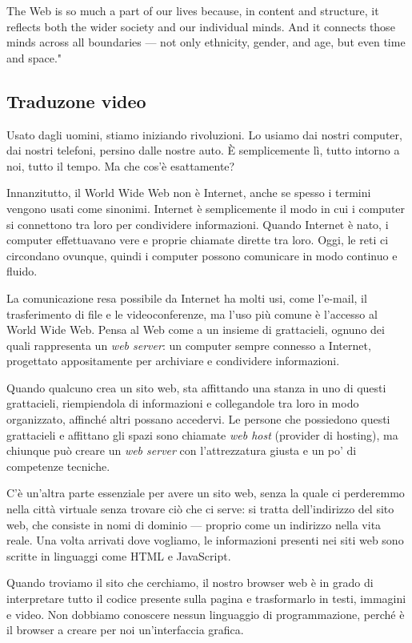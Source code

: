 The Web is so much a part of our lives because, in content and structure, it reflects both the wider society and our individual minds. And it connects those minds across all boundaries — not only ethnicity, gender, and age, but even time and space."


 \subsection{Traduzone video}

Usato dagli uomini, stiamo iniziando rivoluzioni. Lo usiamo dai nostri computer, dai nostri telefoni, persino dalle nostre auto. È semplicemente lì, tutto intorno a noi, tutto il tempo. Ma che cos'è esattamente?

Innanzitutto, il World Wide Web non è Internet, anche se spesso i termini vengono usati come sinonimi. Internet è semplicemente il modo in cui i computer si connettono tra loro per condividere informazioni. Quando Internet è nato, i computer effettuavano vere e proprie chiamate dirette tra loro. Oggi, le reti ci circondano ovunque, quindi i computer possono comunicare in modo continuo e fluido.

La comunicazione resa possibile da Internet ha molti usi, come l’e-mail, il trasferimento di file e le videoconferenze, ma l’uso più comune è l’accesso al World Wide Web. Pensa al Web come a un insieme di grattacieli, ognuno dei quali rappresenta un \textit{web server}: un computer sempre connesso a Internet, progettato appositamente per archiviare e condividere informazioni.

Quando qualcuno crea un sito web, sta affittando una stanza in uno di questi grattacieli, riempiendola di informazioni e collegandole tra loro in modo organizzato, affinché altri possano accedervi. Le persone che possiedono questi grattacieli e affittano gli spazi sono chiamate \textit{web host} (provider di hosting), ma chiunque può creare un \textit{web server} con l’attrezzatura giusta e un po’ di competenze tecniche.

C'è un'altra parte essenziale per avere un sito web, senza la quale ci perderemmo nella città virtuale senza trovare ciò che ci serve: si tratta dell’indirizzo del sito web, che consiste in nomi di dominio — proprio come un indirizzo nella vita reale. Una volta arrivati dove vogliamo, le informazioni presenti nei siti web sono scritte in linguaggi come HTML e JavaScript.

Quando troviamo il sito che cerchiamo, il nostro browser web è in grado di interpretare tutto il codice presente sulla pagina e trasformarlo in testi, immagini e video. Non dobbiamo conoscere nessun linguaggio di programmazione, perché è il browser a creare per noi un'interfaccia grafica.

